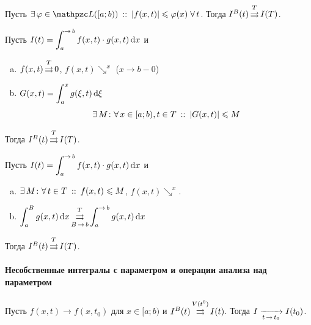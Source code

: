 \documentclass[draft, timbord]{longnotes}
\begin{document}
\begin{thrm}\label{thrm:meas::paruniconv::wei}
  Пусть $\exists\, \varphi\in \summb([a;b))\that |f(x,t)| \leqslant \varphi (x)\; \forall\, t$.
  Тогда $I^B(t) \mathop{\rightrightarrows}\limits^T I(T)$.
\end{thrm}

\begin{thrm}\label{thrm:meas::paruniconv::dir}
  Пусть $I(t) = \dint_{a}^{\to b} f(x,t) \cdot g(x,t) \, \del x$ и
  \begin{enumerate}[a)]
    \item $f(x,t) \mathop{\rightrightarrows}\limits^T 0$, $f(x,t) \searrow^x$ ($x\to b-0$)
    \item $G(x,t) = \displaystyle\int_a^x g(\xi, t) \, \mathrm{d} \xi$
      \[
        \exists\, M \colon \forall\, x \in [a;b), t\in T \:::\: | G(x,t) | \leqslant M   
      \]
  \end{enumerate}
  Тогда $I^B(t) \mathop{\rightrightarrows}\limits^T I(T)$.
\end{thrm}

\begin{thrm}\label{thrm:meas::paruniconv::abel}
  Пусть $I(t) = \dint_{a}^{\to b} f(x,t) \cdot g(x,t) \, \del x$ и
  \begin{enumerate}[a)]
    \item $\exists\, M \colon \forall\, t\in T \:::\: f(x,t) \leqslant M$,
      $f(x,t) \searrow^x$.
    \item 
      $\displaystyle
      \int_a^{B} g(x,t) \, \del x \unito^T_{B\to b} \int_a^{\to b} g(x,t) \, \del x 
      $
  \end{enumerate}
  Тогда $I^B(t) \mathop{\rightrightarrows}\limits^T I(T)$.
\end{thrm}

\paragraph{Несобственные интегралы с параметром и операции анализа над параметром \underdev}
\label{par:meas::parimpconv}

\begin{thrm}\label{thrm:meas::parimpconv::lim}
  Пусть $f(x,t) \to f(x,t_0)$ для \alev $x \in [a;b)$ и $I^B(t) \mathop{\rightrightarrows}\limits^{V(t^0)} I(t)$.
  Тогда $I \xto{t\to t_0} I(t_0)$.
\end{thrm}
\end{document}
